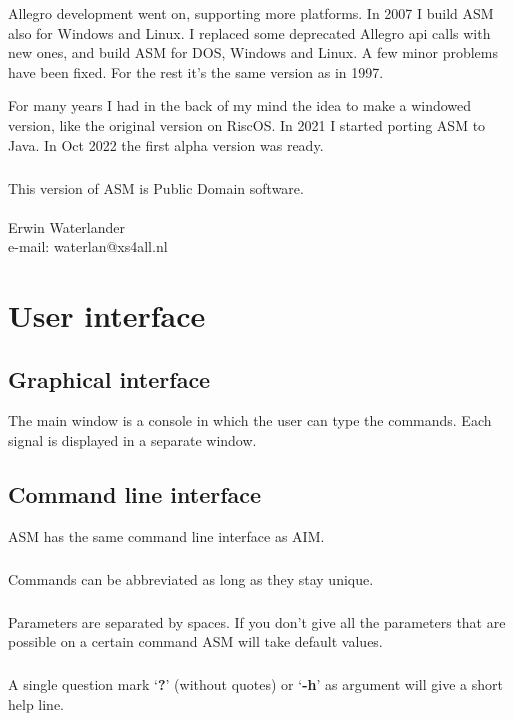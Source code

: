 \documentclass{report}
\begin{document}
Allegro development went on, supporting more platforms.  In 2007 I build ASM
also for Windows and Linux.  I replaced some deprecated Allegro api calls with
new ones, and build ASM for DOS, Windows and Linux. A few minor problems have
been fixed. For the rest it's the same version as in 1997.

For many years I had in the back of my mind the idea to make a windowed
version, like the original version on RiscOS. In 2021 I started porting ASM to
Java. In Oct 2022 the first alpha version was ready.


\paragraph{}
This version of ASM is Public Domain software.\\\\
Erwin Waterlander\\
e-mail: waterlan@xs4all.nl


\chapter{User interface}

\section{Graphical interface}

The main window is a console in which the user can type the
commands. Each signal is displayed in a separate window.

\section{Command line interface}

ASM has the same command line interface as AIM.

\paragraph{}
Commands can be abbreviated as long as they stay unique.

\paragraph{}
Parameters are separated by spaces.
If you don't give all the parameters that are possible on
a certain command ASM will take default values.

\paragraph{}
A single question mark `\textbf{?}' (without quotes) or
`\textbf{-h}' as argument will give a short help line.
\end{document}
